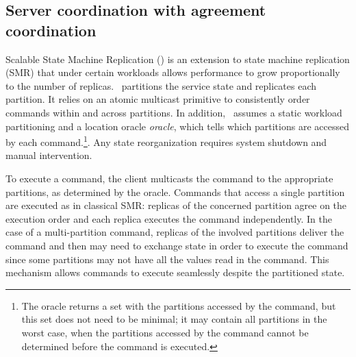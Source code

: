 \subsection{Server coordination with agreement coordination}
\label{sec:ssmr}
Scalable State Machine Replication (\ssmr) is an extension to state machine
replication (SMR) that under certain workloads allows performance to grow
proportionally to the number of replicas. \ssmr\ partitions the service state
and replicates each partition. It relies on an atomic multicast primitive to
consistently order commands within and across partitions. In addition, \ssmr\
assumes a static workload partitioning and a location oracle \emph{oracle},
which tells which partitions are accessed by each command.\footnote{The oracle
returns a set with the partitions accessed by the command, but this set does not
need to be minimal; it may contain all partitions in the worst case, when the
partitions accessed by the command cannot be determined before the command is
executed.}. Any state reorganization requires system shutdown and manual
intervention.



To execute a command, the client multicasts the command to the appropriate
partitions, as determined by the oracle. Commands that access a single partition
are executed as in classical SMR: replicas of the concerned partition agree on
the execution order and each replica executes the command independently. In the
case of a multi-partition command, replicas of the involved partitions deliver
the command and then may need to exchange state in order to execute the command
since some partitions may not have all the values read in the command. This
mechanism allows commands to execute seamlessly despite the partitioned state.

